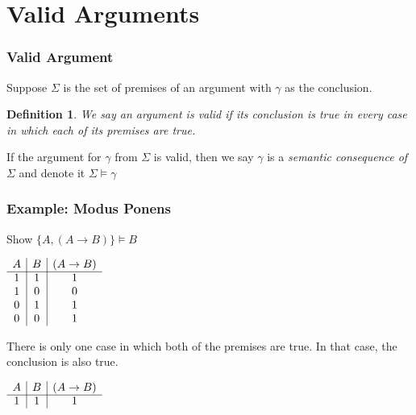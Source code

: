 \documentclass{beamer}
\theoremstyle{indentDefn} \newtheorem{defn}[]{Definition}
\begin{document}
\section{Valid Arguments}

\begin{frame}
	\frametitle{Valid Argument}
	
	Suppose $\Sigma$ is the set of premises of an argument with $\gamma$ as the conclusion.
	
	\begin{defn} We say an argument is valid if its conclusion is true in every case in which each of its premises are true.
	\end{defn}
 
	\vspace{0.5cm}
	
	If the argument for $\gamma$ from $\Sigma$ is valid, then we say $\gamma$ is a \emph{semantic consequence of } $\Sigma$ and denote it $\Sigma \vDash \gamma$ 
	
	\vspace{1cm}
	

\end{frame}

\begin{frame}
	\frametitle{Example: Modus Ponens}
	
	Show $\{A, (A \rightarrow B)\} \vDash B$
	
	
	\pause
	\vspace{1cm}
	\begin{center}
		$\begin{array}{ c | c | c }			
			A & B & (A\rightarrow B)\\
			\cline{1 - 3}
			1 & 1 & 1 \\ 
			1 & 0 & 0\\
			0 & 1 & 1\\
			0 & 0 & 1	
		\end{array}$
	\end{center}	

	\pause
	\vspace{1cm}
	There is only one case in which both of the premises are true. In that case, the conclusion is also true.
		\begin{center}
			$\begin{array}{ c | c | c }			
				A & B & (A\rightarrow B)\\
				\cline{1 - 3}
				1 & 1 & 1 \\ 	
			\end{array}$
		\end{center}	
	
\end{frame}
\end{document}
